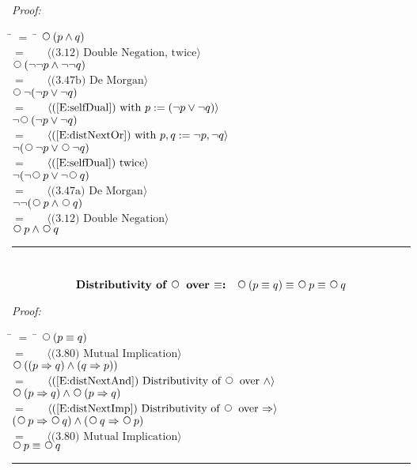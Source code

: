 \documentclass[fleqn, leqno]{article}
\newcommand{\lgap}{2pt}                             %
\newcommand{\mymathindent}{24pt}                    %
\newcommand{\Next}{\;\,\text{\raisebox{3.5pt}{\circle{6}}}}
\newcommand{\myqed}{\hfill\rule[-.23ex]{1.2ex}{2.0ex}}
\newcommand{\Gll} {\langle}                         %
\newcommand{\Ggg} {\rangle}                         %
\newcommand{\Hint}[1]     {\ \ \ $\Gll              \mbox{#1} \Ggg$ }   %
\begin{document}
\emph{Proof:}
\begin{tabbing}
\hspace{\mymathindent} \= $= \;$ \= \kill
  \> \>   $\Next (p \land q)$\\[\lgap]
  \> $=$  \>  \Hint{(3.12) Double Negation, twice}\\[\lgap]
  \> \>   $\Next (\lnot\lnot p \land \lnot\lnot q)$\\[\lgap]
  \> $=$  \>  \Hint{(3.47b) De Morgan}\\[\lgap]
  \> \>   $\Next\lnot(\lnot p \lor \lnot q)$\\[\lgap]
  \> $=$  \>  \Hint{(\ref{E:selfDual}) with $p:= (\lnot p \lor \lnot q$)}\\[\lgap]
  \> \>   $\lnot\Next (\lnot p \lor \lnot q)$\\[\lgap]
  \> $=$  \>  \Hint{(\ref{E:distNextOr}) with $p,q := \lnot p, \lnot q$}\\[\lgap]
  \> \>   $\lnot (\Next\lnot p \lor \Next \lnot q)$\\[\lgap]
  \> $=$  \>  \Hint{(\ref{E:selfDual}) twice}\\[\lgap]
  \> \>   $\lnot(\lnot\Next p \lor \lnot\Next q)$\\[\lgap]
  \> $=$  \>  \Hint{(3.47a) De Morgan}\\[\lgap]
  \> \>   $\lnot\lnot(\Next p \land \Next q)$\\[\lgap]
  \> $=$  \>  \Hint{(3.12) Double Negation}\\[\lgap]
  \> \>   $\Next p \land \Next q$\\[\lgap]
\end{tabbing}
\myqed\\[\lgap]


\begin{equation}\label{E:distNextEquiv}
\textbf{Distributivity of $\Next$ over $\equiv$:}\quad \Next (p \equiv q) \equiv \Next p \equiv \Next q
\end{equation}

\emph{Proof:}
\begin{tabbing}
\hspace{\mymathindent} \= $= \;$ \= \kill
  \> \>   $\Next (p \equiv q)$\\[\lgap]
  \> $=$  \>  \Hint{(3.80) Mutual Implication}\\[\lgap]
  \> \>   $\Next ((p \Rightarrow q) \land (q \Rightarrow p))$\\[\lgap]
  \> $=$  \>  \Hint{(\ref{E:distNextAnd}) Distributivity of $\Next$ over $\land$}\\[\lgap]
  \> \>   $\Next (p \Rightarrow q) \land \Next (p \Rightarrow q)$\\[\lgap]
  \> $=$  \>  \Hint{(\ref{E:distNextImp}) Distributivity of $\Next$ over $\Rightarrow$}\\[\lgap]
  \> \>   $(\Next p \Rightarrow \Next q) \land (\Next q \Rightarrow \Next p)$\\[\lgap]
  \> $=$  \>  \Hint{(3.80) Mutual Implication}\\[\lgap]
  \> \>   $\Next p \equiv \Next q$
\end{tabbing}
\myqed\\[\lgap]
\end{document}

